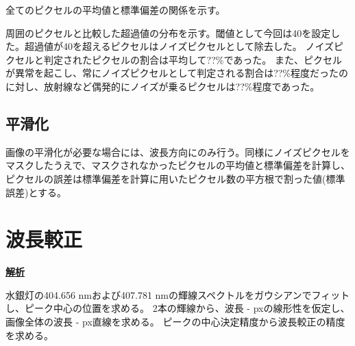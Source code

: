 \documentclass[a4paper,11pt,uplatex]{jsbook}
\begin{document}
全てのピクセルの平均値と標準偏差の関係を示す。

周囲のピクセルと比較した超過値の分布を示す。閾値として今回は40を設定した。超過値が40を超えるピクセルはノイズピクセルとして除去した。
ノイズピクセルと判定されたピクセルの割合は平均して??\%であった。
また、ピクセルが異常を起こし、常にノイズピクセルとして判定される割合は??\%程度だったのに対し、放射線など偶発的にノイズが乗るピクセルは??\%程度であった。
\subsection{平滑化}
画像の平滑化が必要な場合には、波長方向にのみ行う。同様にノイズピクセルをマスクしたうえで、マスクされなかったピクセルの平均値と標準偏差を計算し、ピクセルの誤差は標準偏差を計算に用いたピクセル数の平方根で割った値(標準誤差)とする。

\section{波長較正}
\noindent \textbf{\underline{解析}}\par
水銀灯の404.656 nmおよび407.781 nmの輝線スペクトルをガウシアンでフィットし、ピーク中心の位置を求める。
2本の輝線から、波長 - pxの線形性を仮定し、画像全体の波長 - px直線を求める。
ピークの中心決定精度から波長較正の精度を求める。
\end{document}
